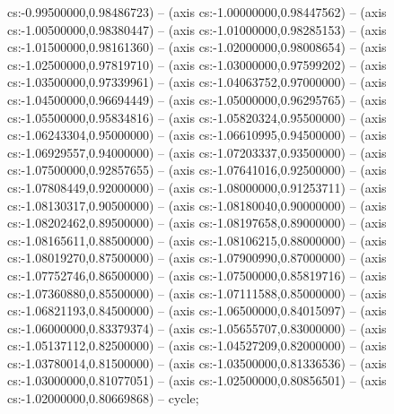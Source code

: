 cs:-0.99500000,0.98486723) -- (axis cs:-1.00000000,0.98447562) -- (axis cs:-1.00500000,0.98380447) -- (axis cs:-1.01000000,0.98285153) -- (axis cs:-1.01500000,0.98161360) -- (axis cs:-1.02000000,0.98008654) -- (axis cs:-1.02500000,0.97819710) -- (axis cs:-1.03000000,0.97599202) -- (axis cs:-1.03500000,0.97339961) -- (axis cs:-1.04063752,0.97000000) -- (axis cs:-1.04500000,0.96694449) -- (axis cs:-1.05000000,0.96295765) -- (axis cs:-1.05500000,0.95834816) -- (axis cs:-1.05820324,0.95500000) -- (axis cs:-1.06243304,0.95000000) -- (axis cs:-1.06610995,0.94500000) -- (axis cs:-1.06929557,0.94000000) -- (axis cs:-1.07203337,0.93500000) -- (axis cs:-1.07500000,0.92857655) -- (axis cs:-1.07641016,0.92500000) -- (axis cs:-1.07808449,0.92000000) -- (axis cs:-1.08000000,0.91253711) -- (axis cs:-1.08130317,0.90500000) -- (axis cs:-1.08180040,0.90000000) -- (axis cs:-1.08202462,0.89500000) -- (axis cs:-1.08197658,0.89000000) -- (axis cs:-1.08165611,0.88500000) -- (axis cs:-1.08106215,0.88000000) -- (axis cs:-1.08019270,0.87500000) -- (axis cs:-1.07900990,0.87000000) -- (axis cs:-1.07752746,0.86500000) -- (axis cs:-1.07500000,0.85819716) -- (axis cs:-1.07360880,0.85500000) -- (axis cs:-1.07111588,0.85000000) -- (axis cs:-1.06821193,0.84500000) -- (axis cs:-1.06500000,0.84015097) -- (axis cs:-1.06000000,0.83379374) -- (axis cs:-1.05655707,0.83000000) -- (axis cs:-1.05137112,0.82500000) -- (axis cs:-1.04527209,0.82000000) -- (axis cs:-1.03780014,0.81500000) -- (axis cs:-1.03500000,0.81336536) -- (axis cs:-1.03000000,0.81077051) -- (axis cs:-1.02500000,0.80856501) -- (axis cs:-1.02000000,0.80669868) -- cycle;
